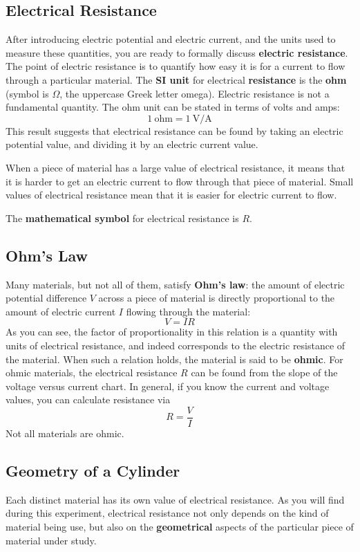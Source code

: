 \subsection{Electrical Resistance}
%
After introducing electric potential and electric current, and the units used to measure these quantities, you are ready to formally discuss \textbf{electric resistance}. The point of electric resistance is to quantify how easy it is for a current to flow through a particular material. The \textbf{SI unit} for electrical \textbf{resistance} is the \textbf{ohm} (symbol is $\Omega$, the uppercase Greek letter omega). Electric resistance is not a fundamental quantity. The ohm unit can be stated in terms of volts and amps:
\begin{equation}
	1 \ \text{ohm} = 1 \ \text{V/A}
\end{equation}
This result suggests that electrical resistance can be found by taking an electric potential value, and dividing it by an electric current value.

When a piece of material has a large value of electrical resistance, it means that it is harder to get an electric current to flow through that piece of material. Small values of electrical resistance mean that it is easier for electric current to flow.

The \textbf{mathematical symbol} for electrical resistance is $R$.
%
\subsection{Ohm's Law}
%
Many materials, but not all of them, satisfy \textbf{Ohm's law}: the amount of electric potential difference $V$ across a piece of material is directly proportional to the amount of electric current $I$ flowing through the material:
\begin{equation}
	V = IR
\end{equation}
As you can see, the factor of proportionality in this relation is a quantity with units of electrical resistance, and indeed corresponds to the electric resistance of the material. When such a relation holds, the material is said to be \textbf{ohmic}. For ohmic materials, the electrical resistance $R$ can be found from the slope of the voltage versus current chart. In general, if you know the current and voltage values, you can calculate resistance via
\begin{equation}
	R = \frac{V}{I}
	\label{eq.02.ohms.law}
\end{equation}
Not all materials are ohmic.
%
\subsection{Geometry of a Cylinder}
%
Each distinct material has its own value of electrical resistance. As you will find during this experiment, electrical resistance not only depends on the kind of material being use, but also on the \textbf{geometrical} aspects of the particular piece of material under study.

